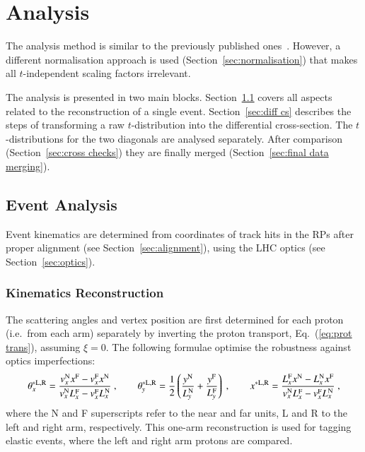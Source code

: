 \section{Analysis}
\label{sec:analysis}

The analysis method is similar to the previously published ones~\cite{epl101-el,prl111}.
However, a different normalisation approach is used (Section~\ref{sec:normalisation}) that makes all $t$-independent scaling factors irrelevant.

The analysis is presented in two main blocks. Section~\ref{sec:event anal} covers all aspects related to the reconstruction of a single event.
Section~\ref{sec:diff cs} describes the steps of transforming a raw $t$-distribution into the differential cross-section. The $t$-distributions for the two diagonals are analysed separately. After comparison (Section~\ref{sec:cross checks}) they are finally merged (Section~\ref{sec:final data merging}).


\subsection{Event Analysis}
\label{sec:event anal}

Event kinematics are determined from coordinates of track hits in the RPs after proper alignment (see Section~\ref{sec:alignment}), using the LHC optics (see Section~\ref{sec:optics}).



\subsubsection{Kinematics Reconstruction}
\label{sec:kinematics}

The scattering angles and vertex position are first determined for each proton (i.e.~from each arm) separately by inverting the proton transport, Eq.~(\ref{eq:prot trans}), assuming $\xi = 0$. The following formulae optimise the robustness against optics imperfections:
\begin{equation}
\label{eq:kin 1a}
	\theta_x^{*\rm L,R} = {v_x^{\rm N} x^{\rm F} - v_x^{\rm F} x^{\rm N}\over v_x^{\rm N} L_x^{\rm F} - v_x^{\rm F} L_x^{\rm N}}\ ,\qquad
	\theta_y^{*\rm L,R} = {1\over 2} \left( {y^{\rm N}\over L_y^{\rm N}} + {y^{\rm F}\over L_y^{\rm F}} \right)\ ,\qquad
	x^{*\rm L,R} = {L_x^{\rm F} x^{\rm N} - L_x^{\rm N} x^{\rm F}\over v_x^{\rm N} L_x^{\rm F} - v_x^{\rm F} L_x^{\rm N} }\ ,
\end{equation}
where the N and F superscripts refer to the near and far units, L and R to the 
left and right arm, respectively. This one-arm reconstruction is used for tagging elastic events, where the left and right arm protons are compared.

